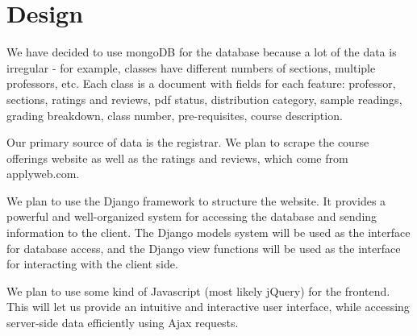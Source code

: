 \documentclass[11pt]{article}
\begin{document}
\section{Design}
\par We have decided to use mongoDB for the database because a lot of the data is irregular - for example, classes have different numbers of sections, multiple professors, etc. Each class is a document with fields for each feature: professor, sections, ratings and reviews, pdf status, distribution category, sample readings, grading breakdown, class number, pre-requisites, course description.
\par Our primary source of data is the registrar. We plan to scrape the course offerings website as well as the ratings and reviews, which come from applyweb.com.
\par We plan to use the Django framework to structure the website. It provides a powerful and well-organized system for accessing the database and sending information to the client. The Django models system will be used as the interface for database access, and the Django view functions will be used as the interface for interacting with the client side.
\par We plan to use some kind of Javascript (most likely jQuery) for the frontend. This will let us provide an intuitive and interactive user interface, while accessing server-side data efficiently using Ajax requests.
\end{document}
